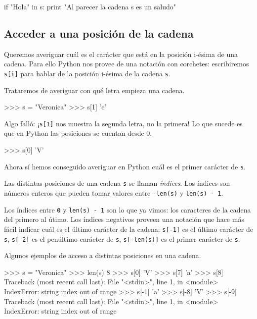 \begin{codigo-python-sn}
if "Hola" in s:
    print "Al parecer la cadena s es un saludo"
\end{codigo-python-sn}

\subsection{Acceder a una posición de la cadena}

Queremos averiguar cuál es el carácter que está en la posición i-ésima de
una cadena.  Para ello Python nos provee de una notación con corchetes:
escribiremos \lstinline+s[i]+ para hablar de la posición i-ésima de la cadena
\lstinline!s!.

Trataremos de averiguar con qué letra empieza una cadena.

\begin{codigo-python-sn}
>>> s = "Veronica"
>>> s[1]
'e'
\end{codigo-python-sn}

Algo falló: ¡\lstinline+s[1]+ nos muestra la segunda letra, no la
primera! Lo que sucede es que en Python las posiciones se cuentan
desde 0.

\begin{codigo-python-sn}
>>> s[0]
'V'
\end{codigo-python-sn}

Ahora sí hemos conseguido averiguar en Python cuál es el primer carácter de
\lstinline!s!.

\begin{atencion}
Las distintas posiciones de una cadena \lstinline!s! se llaman
{\it índices}. Los índices son números enteros que pueden tomar
valores entre \lstinline!-len(s)! y \lstinline!len(s) - 1!.

Los índices entre \lstinline!0! y \lstinline!len(s) - 1! son lo que ya
vimos: los caracteres de la cadena del primero al útimo. Los índices
negativos proveen una notación que hace más fácil indicar cuál es el último
carácter de la cadena: \lstinline!s[-1]! es el último carácter de
\lstinline!s!, \lstinline!s[-2]! es el penúltimo carácter de \lstinline!s!,
\lstinline!s[-len(s)]! es el primer carácter de \lstinline!s!.
\end{atencion}

Algunos ejemplos de acceso a distintas posiciones en una cadena.

\begin{codigo-python-sn}
>>> s = "Veronica"
>>> len(s)
8
>>> s[0]
'V'
>>> s[7]
'a'
>>> s[8]
Traceback (most recent call last):
  File "<stdin>", line 1, in <module>
IndexError: string index out of range
>>> s[-1]
'a'
>>> s[-8]
'V'
>>> s[-9]
Traceback (most recent call last):
  File "<stdin>", line 1, in <module>
IndexError: string index out of range
\end{codigo-python-sn}

